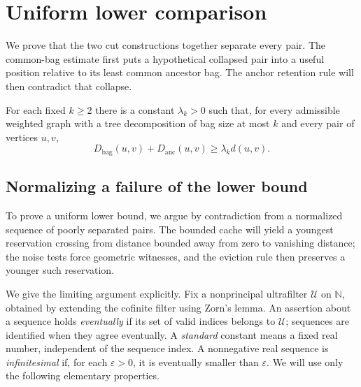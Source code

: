 \section{Uniform lower comparison}\label{sec:lower}

We prove that the two cut constructions together separate every pair.
The common-bag estimate first puts a hypothetical collapsed pair into
a useful position relative to its least common ancestor bag. The anchor
retention rule will then contradict that collapse.

\begin{proposition}\label{prop:combined-lower}
For each fixed $k\geq2$ there is a constant $\lambda_k>0$ such that, for
every admissible weighted graph with a tree decomposition of bag size
at most $k$ and every pair of vertices $u,v$,
\begin{equation}\label{eq:combined-lower}
 D_{\mathrm{bag}}(u,v)+D_{\mathrm{anc}}(u,v)
 \geq\lambda_k d(u,v).
\end{equation}
\end{proposition}

\subsection{Normalizing a failure of the lower bound}

To prove a uniform lower bound, we argue by contradiction from a normalized
sequence of poorly separated pairs. The bounded cache will yield a youngest
reservation crossing from distance bounded away from zero to vanishing
distance; the noise tests force geometric witnesses, and the eviction rule
then preserves a younger such reservation.

We give the limiting argument explicitly.  Fix a nonprincipal ultrafilter
$\mathcal U$ on $\mathbb N$, obtained by extending the cofinite filter
using Zorn's lemma.  An assertion about a sequence holds
\emph{eventually} if its set of valid indices belongs to $\mathcal U$;
sequences are identified when they agree eventually.  A \emph{standard}
constant means a fixed real number, independent of the sequence index.
A nonnegative real sequence is \emph{infinitesimal} if, for each $\varepsilon>0$, it is
eventually smaller than $\varepsilon$.  We will use only the following
elementary properties.

